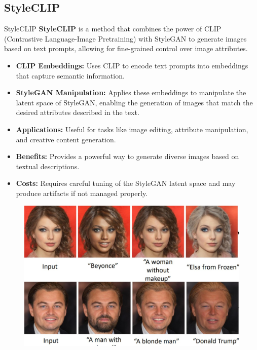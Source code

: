 \subsection{StyleCLIP}
\begin{frame}[allowframebreaks]{StyleCLIP}
    \textbf{StyleCLIP} is a method that combines the power of CLIP (Contrastive Language-Image Pretraining) with StyleGAN to generate images based on text prompts, allowing for fine-grained control over image attributes.

    \begin{itemize}
        \item \textbf{CLIP Embeddings:} Uses CLIP to encode text prompts into embeddings that capture semantic information.
        \item \textbf{StyleGAN Manipulation:} Applies these embeddings to manipulate the latent space of StyleGAN, enabling the generation of images that match the desired attributes described in the text.
        \item \textbf{Applications:} Useful for tasks like image editing, attribute manipulation, and creative content generation.
        \item \textbf{Benefits:} Provides a powerful way to generate diverse images based on textual descriptions.
        \item \textbf{Costs:} Requires careful tuning of the StyleGAN latent space and may produce artifacts if not managed properly.
    \end{itemize}
\framebreak
    \begin{figure}
        \centering
        \includegraphics[width=1\textwidth,height=0.9\textheight,keepaspectratio]{images/video/slide_65_1_img.jpg}
    \end{figure}

\end{frame}
